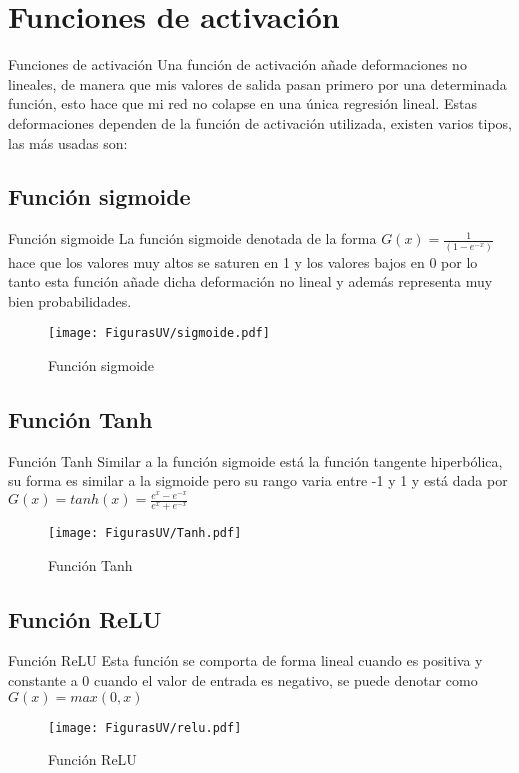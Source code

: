 \documentclass[10pt]{beamer}
\begin{document}
\section{Funciones de activación}
\begin{frame}{Funciones de activación}
Una función de activación añade deformaciones no lineales, de manera que mis valores de salida pasan primero por una determinada función, esto hace que mi red no colapse en una única regresión lineal. Estas deformaciones dependen de la función de activación utilizada, existen varios tipos, las más usadas son:
\end{frame}

\subsection{Función sigmoide}
\begin{frame}{Función sigmoide}
La función sigmoide denotada de la forma $G(x)=\frac{1}{(1-e^{-x})}$  hace que los valores muy altos se saturen en 1 y los valores bajos en 0 por lo tanto esta función añade dicha deformación no lineal y además representa muy bien probabilidades.

\begin{figure}[h!]
  \centering
  \texttt{[image: FigurasUV/sigmoide.pdf]}
  \caption{Función sigmoide}
\end{figure}


\end{frame}
\subsection{Función Tanh}
\begin{frame}{Función Tanh}
Similar a la función sigmoide está la función tangente hiperbólica, su forma es  similar a la sigmoide pero su rango varia entre -1 y 1 y está dada por $G(x)=tanh(x)=\frac{e^{x}-e^{-x}}{e^{x}+e^{-x}}$

\begin{figure}[h!]
  \centering
  \texttt{[image: FigurasUV/Tanh.pdf]}
  \caption{Función Tanh}
\end{figure}

\end{frame}
\subsection{Función ReLU}
\begin{frame}{Función ReLU}
Esta función se comporta de forma lineal cuando es positiva y constante a 0 cuando el valor de entrada es negativo, se puede denotar como $G(x)=max(0,x)$

\begin{figure}[h!]
  \centering
  \texttt{[image: FigurasUV/relu.pdf]}
  \caption{Función ReLU}
\end{figure}

\end{frame}
\end{document}
